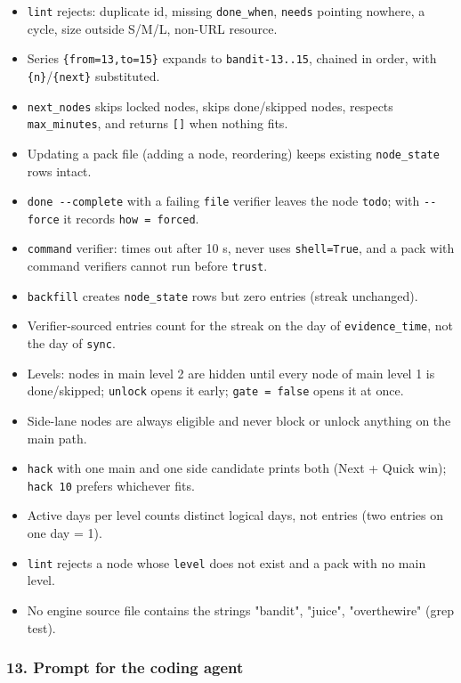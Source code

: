 \begin{itemize}
\tightlist
\item
  \texttt{lint} rejects: duplicate id, missing \texttt{done\_when},
  \texttt{needs} pointing nowhere, a cycle, size outside S/M/L, non-URL
  resource.
\item
  Series \texttt{\{from=13,to=15\}} expands to \texttt{bandit-13..15},
  chained in order, with \texttt{\{n\}}/\texttt{\{next\}} substituted.
\item
  \texttt{next\_nodes} skips locked nodes, skips done/skipped nodes,
  respects \texttt{max\_minutes}, and returns \texttt{{[}{]}} when
  nothing fits.
\item
  Updating a pack file (adding a node, reordering) keeps existing
  \texttt{node\_state} rows intact.
\item
  \texttt{done -\/-complete} with a failing \texttt{file} verifier
  leaves the node \texttt{todo}; with \texttt{-\/-force} it records
  \texttt{how = forced}.
\item
  \texttt{command} verifier: times out after 10 s, never uses
  \texttt{shell=True}, and a pack with command verifiers cannot run
  before \texttt{trust}.
\item
  \texttt{backfill} creates \texttt{node\_state} rows but zero entries
  (streak unchanged).
\item
  Verifier-sourced entries count for the streak on the day of
  \texttt{evidence\_time}, not the day of \texttt{sync}.
\item
  Levels: nodes in main level 2 are hidden until every node of main
  level 1 is done/skipped; \texttt{unlock} opens it early;
  \texttt{gate = false} opens it at once.
\item
  Side-lane nodes are always eligible and never block or unlock anything
  on the main path.
\item
  \texttt{hack} with one main and one side candidate prints both (Next +
  Quick win); \texttt{hack 10} prefers whichever fits.
\item
  Active days per level counts distinct logical days, not entries (two
  entries on one day = 1).
\item
  \texttt{lint} rejects a node whose \texttt{level} does not exist and a
  pack with no main level.
\item
  No engine source file contains the strings "bandit", "juice",
  "overthewire" (grep test).
\end{itemize}

\hypertarget{hackstreak-spec-v2-13-prompt-for-the-coding-agent}{%
\subsubsection{13. Prompt for the coding
agent}\label{hackstreak-spec-v2-13-prompt-for-the-coding-agent}}

